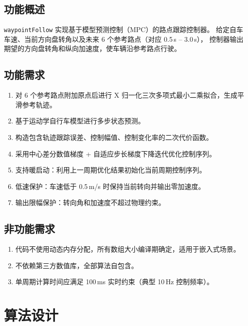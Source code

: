 \documentclass[a4paper,10pt]{article}
\begin{document}
\subsection{功能概述}

\texttt{waypointFollow} 实现基于模型预测控制（MPC）的路点跟踪控制器。
给定自车车速、当前方向盘转角以及未来 6 个参考路点（对应 0.5\,s -- 3.0\,s），
控制器输出期望的方向盘转角和纵向加速度，使车辆沿参考路点行驶。

\subsection{功能需求}

\begin{enumerate}[label=FR-\arabic*]
  \item 对 6 个参考路点附加原点后进行 X 归一化三次多项式最小二乘拟合，生成平滑参考轨迹。
  \item 基于运动学自行车模型进行多步状态预测。
  \item 构造包含轨迹跟踪误差、控制幅值、控制变化率的二次代价函数。
  \item 采用中心差分数值梯度 + 自适应步长梯度下降迭代优化控制序列。
  \item 支持暖启动：利用上一周期优化结果初始化当前周期控制序列。
  \item 低速保护：车速低于 0.5\,m/s 时保持当前转向并输出零加速度。
  \item 输出限幅保护：转向角和加速度不超过物理约束。
\end{enumerate}

\subsection{非功能需求}

\begin{enumerate}[label=NFR-\arabic*]
  \item 代码不使用动态内存分配，所有数组大小编译期确定，适用于嵌入式场景。
  \item 不依赖第三方数值库，全部算法自包含。
  \item 单周期计算时间应满足 100\,ms 实时约束（典型 10\,Hz 控制频率）。
\end{enumerate}

\section{算法设计}
\end{document}
